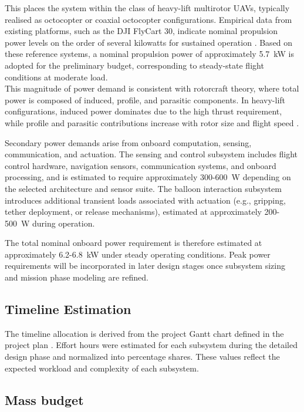 This places the system within the class of heavy-lift multirotor UAVs, typically realised as octocopter or coaxial octocopter configurations. Empirical data from existing platforms, such as the DJI FlyCart 30, indicate nominal propulsion power levels on the order of several kilowatts for sustained operation \cite{DJIDJI}. Based on these reference systems, a nominal propulsion power of approximately 5.7~kW is adopted for the preliminary budget, corresponding to steady-state flight conditions at moderate load.\\

This magnitude of power demand is consistent with rotorcraft theory, where total power is composed of induced, profile, and parasitic components. In heavy-lift configurations, induced power dominates due to the high thrust requirement, while profile and parasitic contributions increase with rotor size and flight speed \cite{Gong2022ModellingUAVs,Liu2017ASystems}.


Secondary power demands arise from onboard computation, sensing, communication, and actuation. The sensing and control subsystem includes flight control hardware, navigation sensors, communication systems, and onboard processing, and is estimated to require approximately 300-600~W depending on the selected architecture and sensor suite. The balloon interaction subsystem introduces additional transient loads associated with actuation (e.g., gripping, tether deployment, or release mechanisms), estimated at approximately 200-500~W during operation.


The total nominal onboard power requirement is therefore estimated at approximately 6.2-6.8~kW under steady operating conditions. Peak power requirements will be incorporated in later design stages once subsystem sizing and mission phase modeling are refined.

\vspace{-10pt}

\subsection{Timeline Estimation}
The timeline allocation is derived from the project Gantt chart defined in the project plan \cite{DSE22}. Effort hours were estimated for each subsystem during the detailed design phase and normalized into percentage shares. These values reflect the expected workload and complexity of each subsystem.
\vspace{-10pt}

\subsection{Mass budget}

